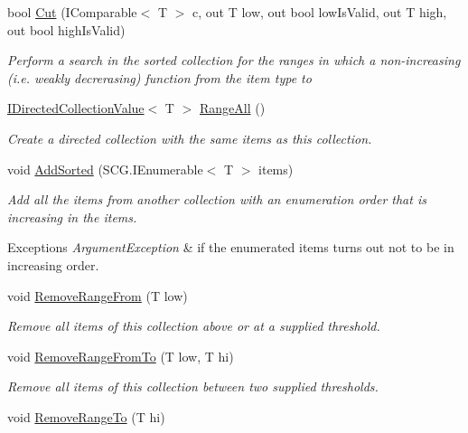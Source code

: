 \begin{DoxyCompactItemize}
bool \hyperlink{class_c5_1_1_sorted_array_a8a2867620de19b2b3bb305b28b6ec03f}{Cut} (I\+Comparable$<$ T $>$ c, out T low, out bool low\+Is\+Valid, out T high, out bool high\+Is\+Valid)
\begin{DoxyCompactList}\small\item\em Perform a search in the sorted collection for the ranges in which a non-\/increasing (i.\+e. weakly decrerasing) function from the item type to \end{DoxyCompactList}\item 
\hyperlink{interface_c5_1_1_i_directed_collection_value}{I\+Directed\+Collection\+Value}$<$ T $>$ \hyperlink{class_c5_1_1_sorted_array_a5bb2adf677c908fcb82b3230ddbf1ac7}{Range\+All} ()
\begin{DoxyCompactList}\small\item\em Create a directed collection with the same items as this collection. \end{DoxyCompactList}\item 
void \hyperlink{class_c5_1_1_sorted_array_a5c8c56e280e5441f600c13214356ad8f}{Add\+Sorted} (S\+C\+G.\+I\+Enumerable$<$ T $>$ items)
\begin{DoxyCompactList}\small\item\em Add all the items from another collection with an enumeration order that is increasing in the items. 
\begin{DoxyExceptions}{Exceptions}
{\em Argument\+Exception} & if the enumerated items turns out not to be in increasing order. \\
\hline
\end{DoxyExceptions}
\end{DoxyCompactList}\item 
void \hyperlink{class_c5_1_1_sorted_array_a82f037857ba7f8c6c101e7a5ef366729}{Remove\+Range\+From} (T low)
\begin{DoxyCompactList}\small\item\em Remove all items of this collection above or at a supplied threshold. \end{DoxyCompactList}\item 
void \hyperlink{class_c5_1_1_sorted_array_ac2dd3e5ecdc1ec54f177d2462d36f9bc}{Remove\+Range\+From\+To} (T low, T hi)
\begin{DoxyCompactList}\small\item\em Remove all items of this collection between two supplied thresholds. \end{DoxyCompactList}\item 
void \hyperlink{class_c5_1_1_sorted_array_aaadeceeaba297251cbd6329276ee1544}{Remove\+Range\+To} (T hi)

\end{DoxyCompactItemize}
